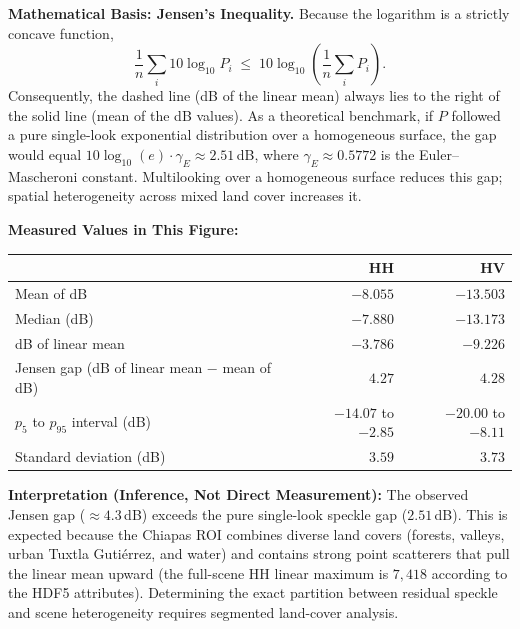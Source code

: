 \documentclass[11pt,a4paper]{article}
\begin{document}
\textbf{Mathematical Basis: Jensen's Inequality.} Because the logarithm is a strictly concave function,
\begin{equation}
  \frac{1}{n}\sum_i 10\log_{10}P_i \;\le\; 10\log_{10}\!\left(\frac{1}{n}\sum_i P_i\right).
\end{equation}
Consequently, the dashed line (dB of the linear mean) always lies to the right of the solid line (mean of the dB values). As a theoretical benchmark, if $P$ followed a pure single-look exponential distribution over a homogeneous surface, the gap would equal $10\log_{10}(e)\cdot\gamma_E \approx 2.51$\,dB, where $\gamma_E \approx 0.5772$ is the Euler--Mascheroni constant. Multilooking over a homogeneous surface reduces this gap; spatial heterogeneity across mixed land cover increases it.

\textbf{Measured Values in This Figure:}

\begin{longtable}{lrr}
\toprule
 & \textbf{HH} & \textbf{HV} \\
\midrule
Mean of dB & $-8.055$ & $-13.503$ \\
Median (dB) & $-7.880$ & $-13.173$ \\
dB of linear mean & $-3.786$ & $-9.226$ \\
Jensen gap (dB of linear mean $-$ mean of dB) & $4.27$ & $4.28$ \\
$p_5$ to $p_{95}$ interval (dB) & $-14.07$ to $-2.85$ & $-20.00$ to $-8.11$ \\
Standard deviation (dB) & $3.59$ & $3.73$ \\
\bottomrule
\end{longtable}

\textbf{Interpretation (Inference, Not Direct Measurement):} The observed Jensen gap ($\approx 4.3$\,dB) exceeds the pure single-look speckle gap ($2.51$\,dB). This is expected because the Chiapas ROI combines diverse land covers (forests, valleys, urban Tuxtla Guti\'errez, and water) and contains strong point scatterers that pull the linear mean upward (the full-scene HH linear maximum is $7,418$ according to the HDF5 attributes). Determining the exact partition between residual speckle and scene heterogeneity requires segmented land-cover analysis.
\end{document}
